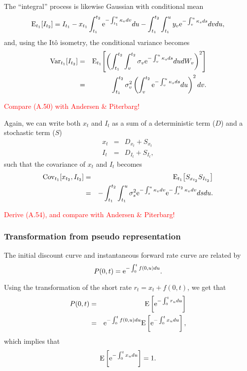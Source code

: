 The ``integral'' process is likewise Gaussian with conditional mean
\begin{equation}
\mathrm{E}_{t_1}\! \left[ I_{t_{2}} \right] = I_{t_1} - x_{t_1} \int_{t_1}^{t_2} \text{e}^{-\int_{t_1}^{u} \kappa_v dv} du - \int_{t_1}^{t_2} \int_{t_1}^{u} y_v \text{e}^{-\int_v^{u} \kappa_s ds} dv du,
\end{equation}
and, using the It\^{o} isometry, the conditional variance becomes
\begin{eqnarray}
\mathrm{Var}_{t_1}\! \left[ I_{t_{2}} \right] &=& \mathrm{E}_{t_1}\! \left[ \left( \int_{t_1}^{t_2} \int_{v}^{t_2} \sigma_v \text{e}^{-\int_v^{u} \kappa_s ds} du dW_v \right)^2 \right] \\
&=& \int_{t_1}^{t_2} \sigma_v^2 \left( \int_{v}^{t_2} \text{e}^{-\int_v^{u} \kappa_s ds} du \right)^2 dv.
\end{eqnarray}

\textcolor{red}{Compare (A.50) with Andersen \& Piterbarg!}

Again, we can write both $x_t$ and $I_t$ as a sum of a deterministic term ($D$) and a stochastic term ($S$)
\begin{eqnarray}
x_t &=& D_{x_t} + S_{x_t} \\
I_t &=& D_{I_t} + S_{I_t},
\end{eqnarray}
such that the covariance of $x_t$ and $I_t$ becomes
\begin{eqnarray}
\mathrm{Cov}_{t_1}\! \left[ x_{t_2}, I_{t_2} \right] &=& \mathrm{E}_{t_1}\! \left[ S_{x_{t_2}} S_{I_{t_2}} \right] \\
&=& - \int_{t_1}^{t_2} \int_{t_1}^u \sigma_s^2 \text{e}^{-\int_s^{u} \kappa_v dv} \text{e}^{-\int_s^{t_2} \kappa_v dv} ds du.
\end{eqnarray}

\textcolor{red}{Derive (A.54), and compare with Andersen \& Piterbarg!}

\subsubsection{Transformation from pseudo representation}

The initial discount curve and instantaneous forward rate curve are related by
\begin{equation}
P(0,t) = \text{e}^{- \int_0^t f(0,u) du}.
\end{equation}

Using the transformation of the short rate $r_t = x_t + f(0,t)$, we get that
\begin{eqnarray}
P(0,t) &=& \mathrm{E} \left[ \text{e}^{- \int_0^t r_u du} \right] \\
&=& \text{e}^{- \int_0^t f(0,u) du} \mathrm{E} \left[ \text{e}^{- \int_0^t x_u du} \right],
\end{eqnarray}
which implies that
\begin{equation}
\mathrm{E} \left[ \text{e}^{- \int_0^t x_u du} \right] = 1.
\end{equation}

